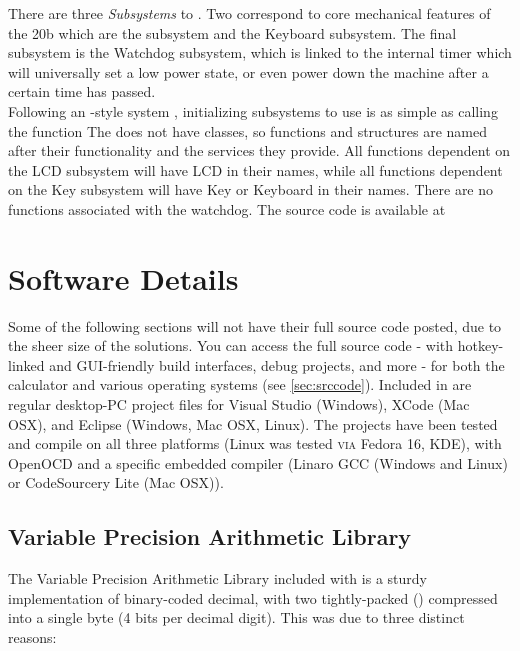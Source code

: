 \documentclass{LibHP20b}
\begin{document}
There are three \emph{Subsystems} to \HP{}. Two correspond to core mechanical features of the 20b which are the \LCD{} subsystem and the Keyboard subsystem. The final subsystem is the Watchdog subsystem, which is linked to the internal timer which will universally set a low power state, or even power down the machine after a certain time has passed.\\
Following an -style system \cite{libsdl}, initializing subsystems to use \HP{} is as simple as calling the  function The  does not have classes, so functions and structures are named after their functionality and the services they provide. All functions dependent on the LCD subsystem will have LCD in their names, while all functions dependent on the Key subsystem will have Key or Keyboard in their names. There are no functions associated with the watchdog. The source code is available at

\section{Software Details}
\label{sec:softdetails}
Some of the following sections will not have their full source code posted, due to the sheer size of the solutions. You can access the full source code - with hotkey-linked and GUI-friendly build interfaces, debug projects, and more - for both the calculator and various operating systems (see \ref{sec:srccode}). Included in  are regular desktop-PC project files for Visual Studio (Windows), XCode (Mac OSX), and Eclipse (Windows, Mac OSX, Linux). The projects have been tested and compile on all three platforms (Linux was tested \textsc{via} Fedora 16, KDE), with OpenOCD and a specific embedded compiler (Linaro GCC (Windows and Linux) or CodeSourcery Lite (Mac OSX)).

\subsection{Variable Precision Arithmetic Library}
\label{sec:libvpa}

The Variable Precision Arithmetic Library included with \HP{} is a sturdy implementation of binary-coded decimal, with two tightly-packed  () compressed into a single byte (4 bits per decimal digit). This was due to three distinct reasons:
\end{document}
